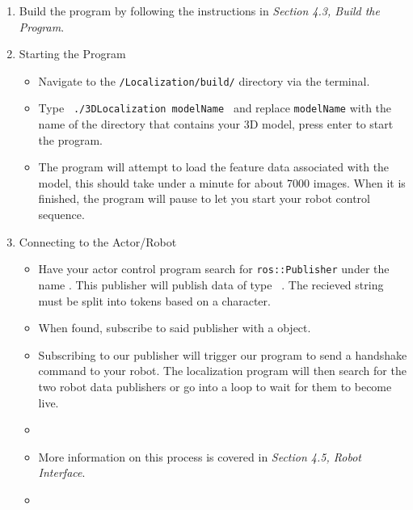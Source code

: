 \documentclass[a4paper,11pt]{article}
\begin{document}
  \begin{enumerate}
  \item Build the program by following the instructions in \emph{Section 4.3, Build the Program}.
  \item Starting the Program
    \begin{itemize}
    \item Navigate to the \texttt{/Localization/build/} directory via the terminal.
    \item Type \texttt{  ./3DLocalization modelName  } and replace \texttt{modelName} with the name of the directory that contains your 3D model, press enter to start the program.
    \item The program will attempt to load the feature data associated with the model, this should take under a minute for about 7000 images. When it is finished, the program will pause to let you start your robot control sequence.
    \end{itemize}
  \item Connecting to the Actor/Robot
    \begin{itemize}
    \item Have your actor control program search for \texttt{ros::Publisher} under the name \texttt{}. This publisher will publish data of type \texttt{ }. The recieved string must be split into tokens based on a \texttt{\detokenize{_}} character. 
    \item When found, subscribe to said publisher with a \texttt{} object.
    \item Subscribing to our publisher will trigger our program to send a handshake command to your robot. The localization program will then search for the two robot data publishers or go into a loop to wait for them to become live. 
    \item 
    \item More information on this process is covered in \emph{Section 4.5, Robot Interface}.
    \item  
    \end{itemize}
  \end{enumerate}
  
  
\end{document}
